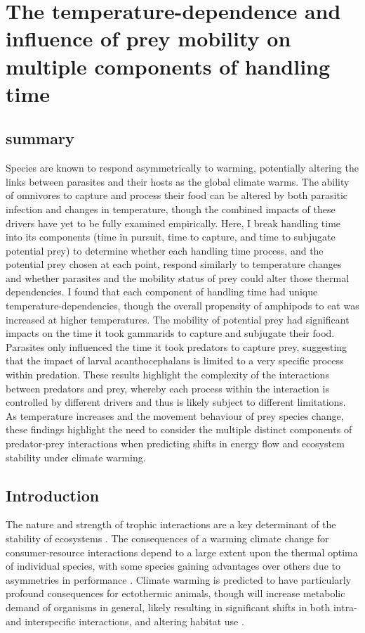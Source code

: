 \chapter[The temperature-dependence and influence of prey mobility on multiple components of handling time]{The temperature-dependence and influence of prey mobility on multiple components of handling time}
\label{chap:feeding}

\section{summary}
Species are known to respond asymmetrically to warming, potentially altering the links between parasites and their hosts as the global climate warms. The ability of omnivores to capture and process their food can be altered by both parasitic infection and changes in temperature, though the combined impacts of these drivers have yet to be fully examined empirically. Here, I break handling time into its components (time in pursuit, time to capture, and time to subjugate potential prey) to determine whether each handling time process, and the potential prey chosen at each point, respond similarly to temperature changes and whether parasites and the mobility status of prey could alter those thermal dependencies. I found that each component of handling time had unique temperature-dependencies, though the overall propensity of amphipods to eat was increased at higher temperatures. The mobility of potential prey had significant impacts on the time it took gammarids to capture and subjugate their food. Parasites only influenced the time it took predators to capture prey, suggesting that the impact of larval acanthocephalans is limited to a very specific process within predation. These results highlight the complexity of the interactions between predators and prey, whereby each process within the interaction is controlled by different drivers and thus is likely subject to different limitations. As temperature increases and the movement behaviour of prey species change, these findings highlight the need to consider the multiple distinct components of predator-prey interactions when predicting shifts in energy flow and ecosystem stability under climate warming.


\section{Introduction}

The nature and strength of trophic interactions are a key determinant of the stability of ecosystems \citep{may1974, pimm1984, ogorman2009, allesina2012, don2016ohu, donohue2017}. The consequences of a warming climate change for consumer-resource interactions depend to a large extent upon the thermal optima of individual species, with some species gaining advantages over others due to asymmetries in performance \citep{dell2014, penk2016}. Climate warming is predicted to have particularly profound consequences for ectothermic animals, though will increase metabolic demand of organisms in general, likely resulting in significant shifts in both intra- and interspecific interactions, and altering habitat use \citep{kordas2011, abram2017, vandervorste2017}. 

